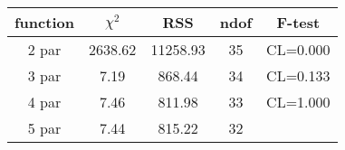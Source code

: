 \begin{tabular}{c|c|c|c|c}
function & $\chi^2$ & RSS & ndof & F-test \\
\hline
2 par & 2638.62 & 11258.93 & 35 & CL=0.000 \\
3 par & 7.19 & 868.44 & 34 & CL=0.133 \\
4 par & 7.46 & 811.98 & 33 & CL=1.000 \\
5 par & 7.44 & 815.22 & 32 & \\
\hline
\end{tabular}